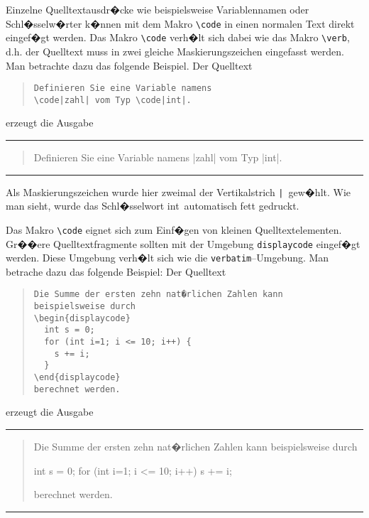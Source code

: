 Einzelne Quelltextausdr�cke wie beispielsweise Variablennamen oder Schl�sselw�rter k�nnen mit dem Makro \verb|\code| in einen normalen Text direkt eingef�gt werden. Das Makro \verb|\code| verh�lt sich dabei wie das Makro \verb|\verb|, d.h.
der Quelltext muss in zwei gleiche Maskierungszeichen eingefasst werden. Man betrachte dazu das folgende Beispiel. Der Quelltext

\begin{quote}
\begin{verbatim}
Definieren Sie eine Variable namens 
\code|zahl| vom Typ \code|int|.
\end{verbatim}
\end{quote}

\noindent
erzeugt die Ausgabe

\vspace*{2em}
\hrule
\begin{quote}
Definieren Sie eine Variable namens 
\code|zahl| vom Typ \code|int|.
\end{quote}
\hrule
\vspace*{2em}

\noindent
Als Maskierungszeichen wurde hier zweimal der Vertikalstrich \glqq\verb/|/\grqq\ gew�hlt. Wie man sieht, wurde das Schl�sselwort \glqq int\grqq\ automatisch fett gedruckt. 

Das Makro \verb|\code| eignet sich zum Einf�gen von kleinen Quelltextelementen. Gr��ere Quelltextfragmente sollten mit der Umgebung \verb|displaycode| eingef�gt werden. Diese Umgebung verh�lt sich wie die \verb|verbatim|--Umgebung. Man betrache dazu das folgende Beispiel: Der Quelltext

\begin{quote}
\begin{verbatim}
Die Summe der ersten zehn nat�rlichen Zahlen kann 
beispielsweise durch
\begin{displaycode}
  int s = 0;
  for (int i=1; i <= 10; i++) {
    s += i;
  }
\end{displaycode}
berechnet werden.
\end{verbatim}
\end{quote}

\noindent
erzeugt die Ausgabe

\vspace*{2em}
\hrule
\begin{quote}
Die Summe der ersten zehn nat�rlichen Zahlen kann 
beispielsweise durch
\begin{displaycode}
  int s = 0;
  for (int i=1; i <= 10; i++) {
    s += i;
  }
\end{displaycode}
berechnet werden.
\end{quote}
\hrule
\vspace*{2em}

